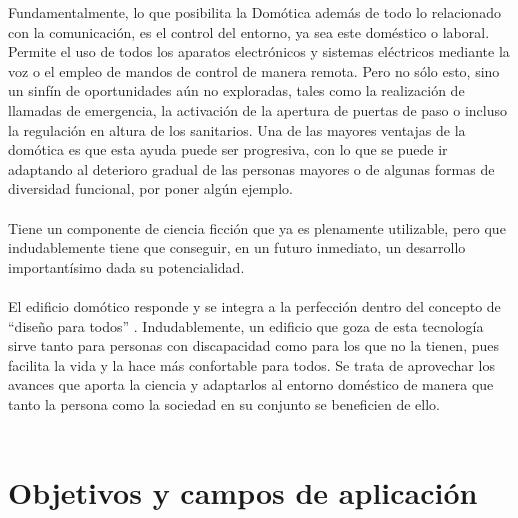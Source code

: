 Fundamentalmente, lo que posibilita la Domótica además de todo lo relacionado con la comunicación, es el control del entorno, ya sea este doméstico o laboral. Permite el uso de todos los aparatos electrónicos y sistemas eléctricos mediante la voz o el empleo de mandos de control de manera remota. Pero no sólo esto, sino un sinfín de oportunidades aún no exploradas, tales como la realización de llamadas de emergencia, la activación de la apertura de puertas de paso o incluso la regulación en altura de los sanitarios. Una de las mayores ventajas de la domótica es que esta ayuda puede ser progresiva, con lo que se puede ir adaptando al deterioro gradual de las personas mayores o de algunas formas de diversidad funcional, por poner algún ejemplo. \\\\
Tiene un componente de ciencia ficción que ya es plenamente utilizable, pero que indudablemente tiene que conseguir, en un futuro inmediato, un desarrollo importantísimo dada su potencialidad. \\\\
El edificio domótico responde y se integra a la perfección dentro del concepto de “diseño para todos” \cite{Colo:2015}. Indudablemente, un edificio que goza de esta tecnología sirve tanto para personas con discapacidad como para los que no la tienen, pues facilita la vida y la hace más confortable para todos. Se trata de aprovechar los avances que aporta la ciencia y adaptarlos al entorno doméstico de manera que tanto la persona como la sociedad en su conjunto se beneficien de ello. \\\\


\section{Objetivos y campos de aplicación}

